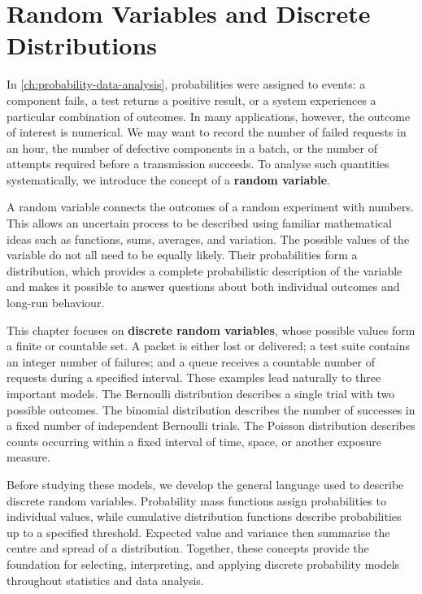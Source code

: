 \chapter{Random Variables and Discrete Distributions}
\label{ch:discrete-distributions}

In \autoref{ch:probability-data-analysis}, probabilities were assigned to events: a component fails, a test returns a positive result, or a system experiences a particular combination of outcomes. In many applications, however, the outcome of interest is numerical. We may want to record the number of failed requests in an hour, the number of defective components in a batch, or the number of attempts required before a transmission succeeds. To analyse such quantities systematically, we introduce the concept of a \textbf{random variable}.

A random variable connects the outcomes of a random experiment with numbers. This allows an uncertain process to be described using familiar mathematical ideas such as functions, sums, averages, and variation. The possible values of the variable do not all need to be equally likely. Their probabilities form a distribution, which provides a complete probabilistic description of the variable and makes it possible to answer questions about both individual outcomes and long-run behaviour.

This chapter focuses on \textbf{discrete random variables}, whose possible values form a finite or countable set. A packet is either lost or delivered; a test suite contains an integer number of failures; and a queue receives a countable number of requests during a specified interval. These examples lead naturally to three important models. The Bernoulli distribution describes a single trial with two possible outcomes. The binomial distribution describes the number of successes in a fixed number of independent Bernoulli trials. The Poisson distribution describes counts occurring within a fixed interval of time, space, or another exposure measure.

Before studying these models, we develop the general language used to describe discrete random variables. Probability mass functions assign probabilities to individual values, while cumulative distribution functions describe probabilities up to a specified threshold. Expected value and variance then summarise the centre and spread of a distribution. Together, these concepts provide the foundation for selecting, interpreting, and applying discrete probability models throughout statistics and data analysis.

